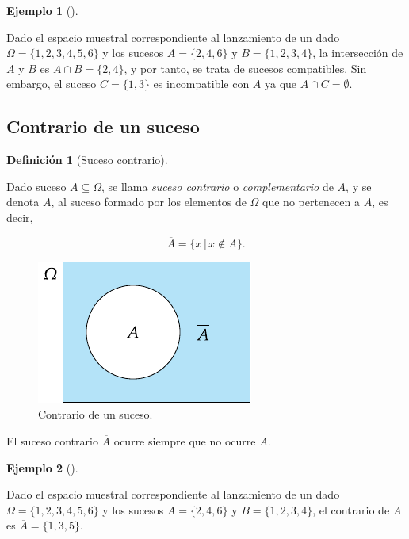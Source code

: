 \documentclass[
  a4paper,
]{scrreport}
\theoremstyle{plain}
\theoremstyle{definition}
\newtheorem{definition}{Definición}[chapter]
\theoremstyle{definition}
\newtheorem{example}{Ejemplo}[chapter]
\theoremstyle{remark}
\begin{document}
\begin{example}[]\protect\hypertarget{exm-interseccion-sucesos}{}\label{exm-interseccion-sucesos}

Dado el espacio muestral correspondiente al lanzamiento de un dado
\(\Omega=\{1,2,3,4,5,6\}\) y los sucesos \(A=\{2,4,6\}\) y
\(B=\{1,2,3,4\}\), la intersección de \(A\) y \(B\) es
\(A\cap B=\{2,4\}\), y por tanto, se trata de sucesos compatibles. Sin
embargo, el suceso \(C=\{1, 3\}\) es incompatible con \(A\) ya que
\(A\cap C=\emptyset\).

\end{example}

\subsection{Contrario de un suceso}\label{contrario-de-un-suceso}

\begin{definition}[Suceso
contrario]\protect\hypertarget{def-contrario-suceso}{}\label{def-contrario-suceso}

Dado suceso \(A\subseteq \Omega\), se llama \emph{suceso contrario} o
\emph{complementario} de \(A\), y se denota \(\overline A\), al suceso
formado por los elementos de \(\Omega\) que no pertenecen a \(A\), es
decir,

\[\overline A = \{x\,|\, x\not\in A\}.\]

\end{definition}

\begin{figure}[H]

{\centering \includegraphics{img/probabilidad/contrario.pdf}

}

\caption{Contrario de un suceso.}

\end{figure}%

El suceso contrario \(\overline A\) ocurre siempre que {no} ocurre
\(A\).

\begin{example}[]\protect\hypertarget{exm-contrario-suceso}{}\label{exm-contrario-suceso}

Dado el espacio muestral correspondiente al lanzamiento de un dado
\(\Omega=\{1,2,3,4,5,6\}\) y los sucesos \(A=\{2,4,6\}\) y
\(B=\{1,2,3,4\}\), el contrario de \(A\) es \(\overline A=\{1,3,5\}\).

\end{example}
\end{document}
